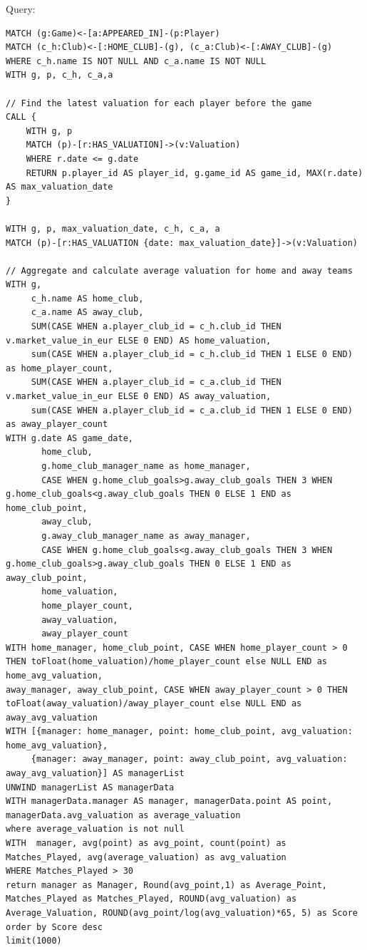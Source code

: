 \documentclass{Configuration_Files/PoliMi3i_thesis}
\begin{document}
Query:

\begin{lstlisting}[language=Cypher]
MATCH (g:Game)<-[a:APPEARED_IN]-(p:Player)
MATCH (c_h:Club)<-[:HOME_CLUB]-(g), (c_a:Club)<-[:AWAY_CLUB]-(g)
WHERE c_h.name IS NOT NULL AND c_a.name IS NOT NULL
WITH g, p, c_h, c_a,a

// Find the latest valuation for each player before the game
CALL {
    WITH g, p
    MATCH (p)-[r:HAS_VALUATION]->(v:Valuation)
    WHERE r.date <= g.date
    RETURN p.player_id AS player_id, g.game_id AS game_id, MAX(r.date) AS max_valuation_date
}

WITH g, p, max_valuation_date, c_h, c_a, a
MATCH (p)-[r:HAS_VALUATION {date: max_valuation_date}]->(v:Valuation)

// Aggregate and calculate average valuation for home and away teams
WITH g, 
     c_h.name AS home_club, 
     c_a.name AS away_club, 
     SUM(CASE WHEN a.player_club_id = c_h.club_id THEN v.market_value_in_eur ELSE 0 END) AS home_valuation,
     sum(CASE WHEN a.player_club_id = c_h.club_id THEN 1 ELSE 0 END) as home_player_count,
     SUM(CASE WHEN a.player_club_id = c_a.club_id THEN v.market_value_in_eur ELSE 0 END) AS away_valuation,
     sum(CASE WHEN a.player_club_id = c_a.club_id THEN 1 ELSE 0 END) as away_player_count
WITH g.date AS game_date, 
       home_club, 
       g.home_club_manager_name as home_manager,
       CASE WHEN g.home_club_goals>g.away_club_goals THEN 3 WHEN g.home_club_goals<g.away_club_goals THEN 0 ELSE 1 END as home_club_point,
       away_club, 
       g.away_club_manager_name as away_manager,
       CASE WHEN g.home_club_goals<g.away_club_goals THEN 3 WHEN g.home_club_goals>g.away_club_goals THEN 0 ELSE 1 END as away_club_point,
       home_valuation, 
       home_player_count,
       away_valuation,
       away_player_count
WITH home_manager, home_club_point, CASE WHEN home_player_count > 0 THEN toFloat(home_valuation)/home_player_count else NULL END as home_avg_valuation,
away_manager, away_club_point, CASE WHEN away_player_count > 0 THEN 
toFloat(away_valuation)/away_player_count else NULL END as away_avg_valuation
WITH [{manager: home_manager, point: home_club_point, avg_valuation: home_avg_valuation}, 
     {manager: away_manager, point: away_club_point, avg_valuation: away_avg_valuation}] AS managerList
UNWIND managerList AS managerData
WITH managerData.manager AS manager, managerData.point AS point, managerData.avg_valuation as average_valuation 
where average_valuation is not null
WITH  manager, avg(point) as avg_point, count(point) as Matches_Played, avg(average_valuation) as avg_valuation
WHERE Matches_Played > 30
return manager as Manager, Round(avg_point,1) as Average_Point, Matches_Played as Matches_Played, ROUND(avg_valuation) as Average_Valuation, ROUND(avg_point/log(avg_valuation)*65, 5) as Score
order by Score desc
limit(1000)
\end{lstlisting}
\end{document}
